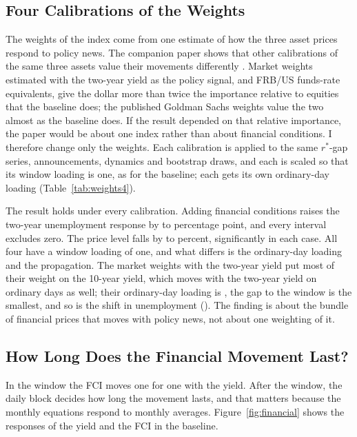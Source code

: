 \documentclass[11pt]{article}
\newcommand{\rs}{r^{*}}
\begin{document}
\subsection{Four Calibrations of the Weights}\label{sec:weights4}
The weights of the index come from one estimate of how the three asset prices respond to policy news. The companion paper shows that other calibrations of the same three assets value their movements differently \citep{fcinote}. Market weights estimated with the two-year yield as the policy signal, and FRB/US funds-rate equivalents, give the dollar more than twice the importance relative to equities that the baseline does; the published Goldman Sachs weights value the two almost as the baseline does. If the result depended on that relative importance, the paper would be about one index rather than about financial conditions. I therefore change only the weights. Each calibration is applied to the same $\rs$-gap series, announcements, dynamics and bootstrap draws, and each is scaled so that its window loading is one, as for the baseline; each gets its own ordinary-day loading (Table~\ref{tab:weights4}).



The result holds under every calibration. Adding financial conditions raises the two-year unemployment response by  to  percentage point, and every interval excludes zero. The price level falls by  to  percent, significantly in each case. All four have a window loading of one, and what differs is the ordinary-day loading and the propagation. The market weights with the two-year yield put most of their weight on the 10-year yield, which moves with the two-year yield on ordinary days as well; their ordinary-day loading is , the gap to the window is the smallest, and so is the shift in unemployment (). The finding is about the bundle of financial prices that moves with policy news, not about one weighting of it.

\subsection{How Long Does the Financial Movement Last?}\label{sec:resolve}
In the window the FCI moves one for one with the yield. After the window, the daily block decides how long the movement lasts, and that matters because the monthly equations respond to monthly averages. Figure~\ref{fig:financial} shows the responses of the yield and the FCI in the baseline.
\end{document}
